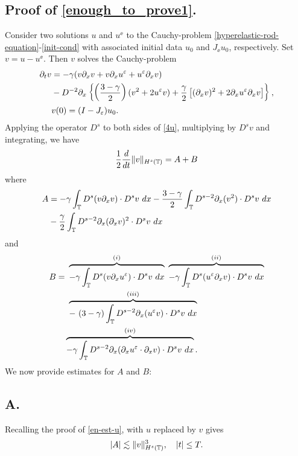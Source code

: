\subsection{ Proof of \eqref{enough_to_prove1}.}
		Consider two solutions $u $ and $u^\ee$ to the Cauchy-problem
	\eqref{hyperelastic-rod-equation}-\eqref{init-cond}
	with associated initial data $u_0$ and
	$J_\ee u_0$, respectively. Set $v= u -u^\ee $. Then $v$ solves the
	Cauchy-problem
	\begin{align}
		\label{4u}
		\partial_t v 
		& =  - \gamma (v \partial_x v + v \partial_x u^\varepsilon + u^\varepsilon \partial_x v)  
		\\
		& - D^{-2} \partial_x \left\{ \left (\frac{3-\gamma}{2} \right )(v^2 +
		2u^\varepsilon v) + \frac{\gamma}{2}\left[ (\partial_x v)^2 + 2 \partial_x u^\varepsilon \partial_x v \right]
		\right\}, \notag
		\\
		& v(0) = (I- J_\varepsilon)u_0.
		\label{5u}
	\end{align}
	Applying the operator $D^s$ to both sides of \eqref{4u}, multiplying by
	$D^s v$ and integrating, we have
	\begin{equation}
		\begin{split}
			\frac{1}{2}\frac{d}{dt} \|v\|_{H^s(\mathbb{T})} = A + B
			\label{6u}
		\end{split}
	\end{equation}
	where
	\begin{equation}
		\begin{split}
			A
			& =  -\gamma \int_{\mathbb{T}} D^s(v \partial_x v) \cdot D^s v \
			dx
			- \frac{3- \gamma}{2} \int_{\mathbb{T}} D^{s-2} \partial_x (v^2) \cdot D^s v
			\ dx
			\\
			& - \frac{\gamma}{2}\int_{\mathbb{T}} D^{s-2} \partial_x (\partial_x v)^2 \cdot D^s
			v \ dx
			\label{7u}
		\end{split}
	\end{equation}
	and
	\begin{equation}
		\begin{split}
			B 
			= & \ \overbrace{-\gamma \int_{\mathbb{T}} D^s (v \partial_x u^\varepsilon ) \cdot D^s v \
			 dx}^{(i)} \ \overbrace{-\gamma \int_{\mathbb{T}} D^s (u^\varepsilon \partial_x v) \cdot D^s v \
			 dx}^{(ii)}
			  \\
			  & \ \overbrace{- \ ( 3- \gamma) \int_{\mathbb{T}} D^{s-2} \partial_x (u^\varepsilon v) \cdot D^s
			 v \ dx}^{(iii)}
			 \\
			 & \overbrace{-\gamma \int_{\mathbb{T}} D^{s-2} \partial_x
			(\partial_x u^\varepsilon \cdot \partial_x v) \cdot D^s v \
			dx}^{(iv)}.
			\label{8u}
		\end{split}
	\end{equation}
	We now provide estimates for $A$ and $B$:
	\subsection{ A.} 
	Recalling the proof of \eqref{en-est-u}, with $u$ replaced by
	$v$ gives 
	\begin{equation}
		\begin{split}
			|A| \lesssim \|v\|_{H^s(\mathbb{T})}^3, \quad |t| \le T.
			\label{8'u}
		\end{split}
	\end{equation}
%
